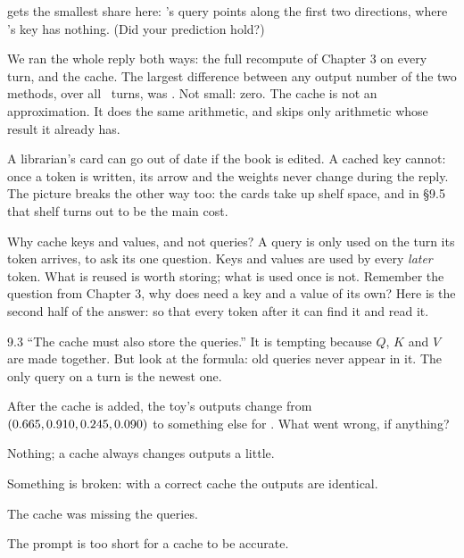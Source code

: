  gets the smallest share here: 's query points along the first two directions, where
's key has nothing. (Did your prediction hold?)

\Sanity We ran the whole reply both ways: the full recompute of Chapter 3 on every turn, and the cache.
The largest difference between any output number of the two methods, over all \nNineSteps\ turns, was
\nNineMaxDiff. Not small: zero. The cache is not an approximation. It does the same arithmetic, and skips only
arithmetic whose result it already has.

\begin{breaks}
A librarian's card can go out of date if the book is edited. A cached key cannot: once a token is written,
its arrow and the weights never change during the reply. The picture breaks the other way too: the cards
take up shelf space, and in \S9.5 that shelf turns out to be the main cost.
\end{breaks}

\Why Why cache keys and values, and not queries? A query is only used on the turn its token arrives, to
ask its one question. Keys and values are used by every \emph{later} token. What is reused is worth
storing; what is used once is not. Remember the question from Chapter 3, why does  need a key and a
value of its own? Here is the second half of the answer: so that every token after it can find it and read it.

\begin{wrongidea}{9.3}
``The cache must also store the queries.'' It is tempting because $Q$, $K$ and $V$ are made together. But
look at the formula: old queries never appear in it. The only query on a turn is the newest one.
\end{wrongidea}

\begin{checkq}
After the cache is added, the toy's outputs change from $(0.665, 0.910, 0.245, 0.090)$ to something else for . What
went wrong, if anything?
\begin{options}
\item Nothing; a cache always changes outputs a little.
\item Something is broken: with a correct cache the outputs are identical.
\item The cache was missing the queries.
\item The prompt is too short for a cache to be accurate.
\end{options}
\end{checkq}

